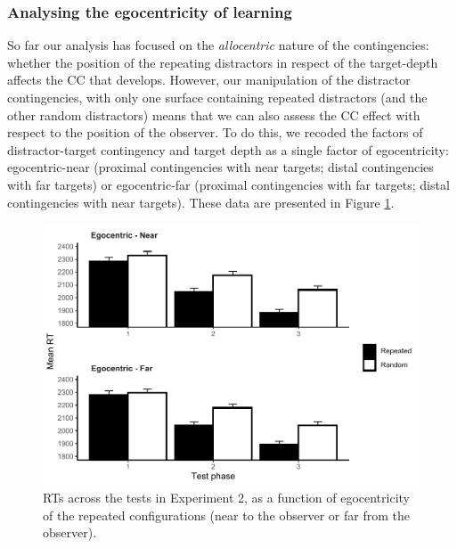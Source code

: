 \documentclass[
  english,
  man,floatsintext]{apa7}
\begin{document}
\hypertarget{analysing-the-egocentricity-of-learning}{%
\subsubsection{Analysing the egocentricity of learning}\label{analysing-the-egocentricity-of-learning}}

So far our analysis has focused on the \emph{allocentric} nature of the contingencies: whether the position of the repeating distractors in respect of the target-depth affects the CC that develops. However, our manipulation of the distractor contingencies, with only one surface containing repeated distractors (and the other random distractors) means that we can also assess the CC effect with respect to the position of the observer. To do this, we recoded the factors of distractor-target contingency and target depth as a single factor of egocentricity: egocentric-near (proximal contingencies with near targets; distal contingencies with far targets) or egocentric-far (proximal contingencies with far targets; distal contingencies with near targets). These data are presented in Figure \ref{fig:Exp2-ego-figure}.



\begin{figure}

{\centering \includegraphics[width=1\linewidth]{CCVR_manuscript_files/figure-latex/Exp2-ego-figure-1} 

}

\caption{RTs across the tests in Experiment 2, as a function of egocentricity of the repeated configurations (near to the observer or far from the observer).}\label{fig:Exp2-ego-figure}
\end{figure}
\end{document}
